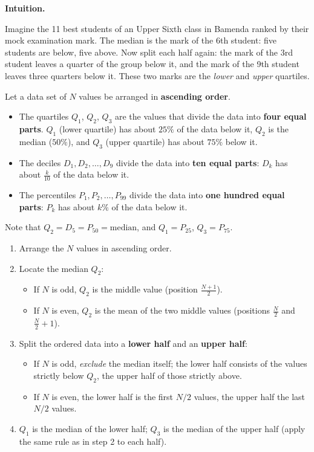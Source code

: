 \documentclass[11pt]{article}
\newcommand{\cle}[1]{{\popxbold\color{popdark}#1}}
\newcounter{popsec}
\newcounter{popsub}
\newcommand{\courssub}[1]{%
  \stepcounter{popsub}%
  \par\vspace{9pt}\noindent{\popxbold\fontsize{11.5}{13}\selectfont\color{popink}{\color{poporange}\thepopsec.\thepopsub}\hspace{6pt}#1}\par\nopagebreak\vspace{4pt}
}
\begin{document}
\courssub{Quartiles of Ungrouped Data}

\textbf{Intuition.}\par
Imagine the 11 best students of an Upper Sixth class in Bamenda ranked by their mock examination mark. The median is the mark of the 6th student: five students are below, five above. Now split each half again: the mark of the 3rd student leaves a quarter of the group below it, and the mark of the 9th student leaves three quarters below it. These two marks are the \emph{lower} and \emph{upper} quartiles.

\begin{definition}
Let a data set of $N$ values be arranged in \textbf{ascending order}.
\begin{itemize}
\item The \cle{quartiles} $Q_1$, $Q_2$, $Q_3$ are the values that divide the data into \textbf{four equal parts}. $Q_1$ (lower quartile) has about $25\%$ of the data below it, $Q_2$ is the median ($50\%$), and $Q_3$ (upper quartile) has about $75\%$ below it.
\item The \cle{deciles} $D_1, D_2, \dots, D_9$ divide the data into \textbf{ten equal parts}: $D_k$ has about $\tfrac{k}{10}$ of the data below it.
\item The \cle{percentiles} $P_1, P_2, \dots, P_{99}$ divide the data into \textbf{one hundred equal parts}: $P_k$ has about $k\%$ of the data below it.
\end{itemize}
Note that $Q_2 = D_5 = P_{50} = \text{median}$, and $Q_1 = P_{25}$, $Q_3 = P_{75}$.
\end{definition}

\begin{methode}
\begin{enumerate}
\item Arrange the $N$ values in ascending order.
\item Locate the median $Q_2$:
      \begin{itemize}
      \item If $N$ is odd, $Q_2$ is the middle value (position $\frac{N+1}{2}$).
      \item If $N$ is even, $Q_2$ is the mean of the two middle values (positions $\frac{N}{2}$ and $\frac{N}{2}+1$).
      \end{itemize}
\item Split the ordered data into a \textbf{lower half} and an \textbf{upper half}:
      \begin{itemize}
      \item If $N$ is odd, \emph{exclude} the median itself; the lower half consists of the values strictly below $Q_2$, the upper half of those strictly above.
      \item If $N$ is even, the lower half is the first $N/2$ values, the upper half the last $N/2$ values.
      \end{itemize}
\item $Q_1$ is the median of the lower half; $Q_3$ is the median of the upper half (apply the same rule as in step 2 to each half).
\end{enumerate}
\end{methode}
\end{document}

